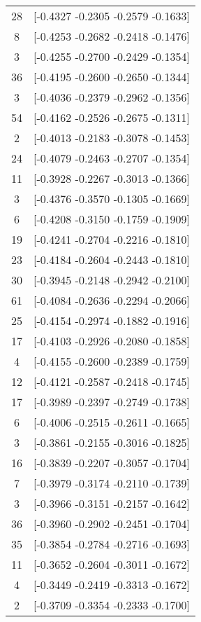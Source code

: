 \documentclass[12pt, fullpage,letterpaper]{article}
\begin{document}
\begin{enumerate}
\begin{enumerate}
{\begin{longtable}{|c|c|}
			 28 &  [-0.4327 -0.2305 -0.2579 -0.1633] \\
			  8 &  [-0.4253 -0.2682 -0.2418 -0.1476] \\
			  3 &  [-0.4255 -0.2700 -0.2429 -0.1354] \\
			 36 &  [-0.4195 -0.2600 -0.2650 -0.1344] \\
			  3 &  [-0.4036 -0.2379 -0.2962 -0.1356] \\
			 54 &  [-0.4162 -0.2526 -0.2675 -0.1311] \\
			  2 &  [-0.4013 -0.2183 -0.3078 -0.1453] \\
			 24 &  [-0.4079 -0.2463 -0.2707 -0.1354] \\
			 11 &  [-0.3928 -0.2267 -0.3013 -0.1366] \\
			  3 &  [-0.4376 -0.3570 -0.1305 -0.1669] \\
			  6 &  [-0.4208 -0.3150 -0.1759 -0.1909] \\
			 19 &  [-0.4241 -0.2704 -0.2216 -0.1810] \\
			 23 &  [-0.4184 -0.2604 -0.2443 -0.1810] \\
			 30 &  [-0.3945 -0.2148 -0.2942 -0.2100] \\
			 61 &  [-0.4084 -0.2636 -0.2294 -0.2066] \\
			 25 &  [-0.4154 -0.2974 -0.1882 -0.1916] \\
			 17 &  [-0.4103 -0.2926 -0.2080 -0.1858] \\
			  4 &  [-0.4155 -0.2600 -0.2389 -0.1759] \\
			 12 &  [-0.4121 -0.2587 -0.2418 -0.1745] \\
			 17 &  [-0.3989 -0.2397 -0.2749 -0.1738] \\
			  6 &  [-0.4006 -0.2515 -0.2611 -0.1665] \\
			  3 &  [-0.3861 -0.2155 -0.3016 -0.1825] \\
			 16 &  [-0.3839 -0.2207 -0.3057 -0.1704] \\
			  7 &  [-0.3979 -0.3174 -0.2110 -0.1739] \\
			  3 &  [-0.3966 -0.3151 -0.2157 -0.1642] \\
			 36 &  [-0.3960 -0.2902 -0.2451 -0.1704] \\
			 35 &  [-0.3854 -0.2784 -0.2716 -0.1693] \\
			 11 &  [-0.3652 -0.2604 -0.3011 -0.1672] \\
			  4 &  [-0.3449 -0.2419 -0.3313 -0.1672] \\
			  2 &  [-0.3709 -0.3354 -0.2333 -0.1700] \\

\end{longtable}}
\end{enumerate}
\end{enumerate}
\end{document}
